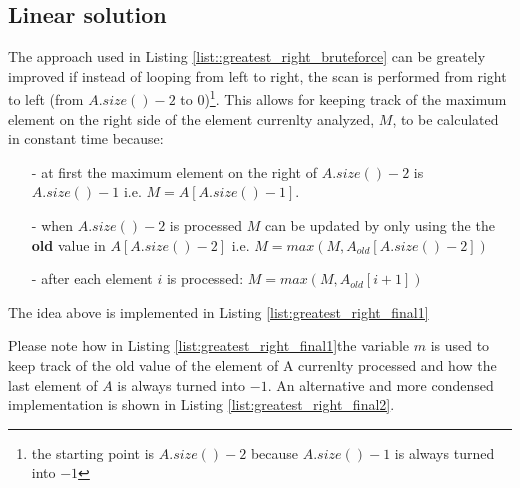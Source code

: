 \subsection{Linear solution}
\label{sec:greatest_right:linear}
The approach used in Listing \ref{list::greatest_right_bruteforce} can be greately improved if instead of looping from left to right, the scan is performed from right to left (from $A.size()-2$ to $0$)\footnote{the starting point is $A.size()-2$ because $A.size()-1$ is always turned into $-1$}. This allows for keeping track of the maximum element on the right  side of the element currenlty analyzed, $M$, to be calculated in constant time because:
\begin{itemize}
	\item[-] at first the maximum element on the right of $A.size()-2$ is $A.size()-1$ i.e. $M = A[A.size()-1]$.
	\item[-] when $A.size()-2$ is processed $M$ can be updated by only using the the \textbf{old} value in $A[A.size()-2]$ i.e. $M= max(M, A_{old}[A.size()-2])$
	\item[-] after each element $i$ is processed: $M= max(M, A_{old}[i+1])$
\end{itemize}

The idea above is implemented in Listing \ref{list:greatest_right_final1}

	

Please note how in Listing \ref{list:greatest_right_final1}the variable $m$ is used to keep track of the old value of the element of A currenlty processed and how the  last element of $A$ is always turned into $-1$.
An alternative and more condensed implementation  is shown in Listing \ref{list:greatest_right_final2}.

	